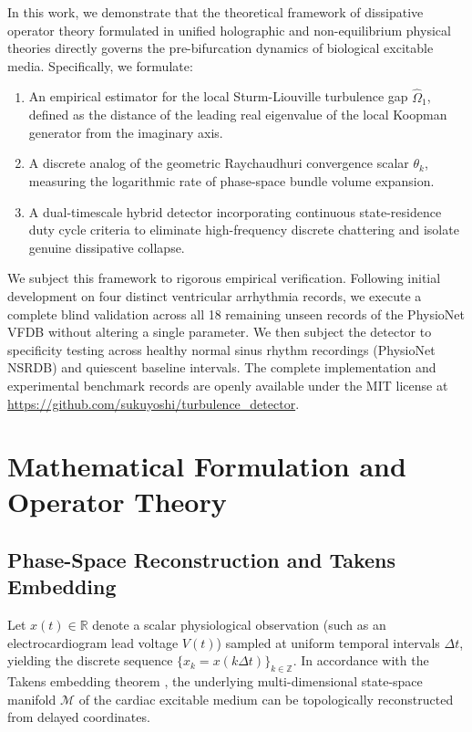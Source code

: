 \documentclass[11pt,a4paper]{article}
\begin{document}
In this work, we demonstrate that the theoretical framework of dissipative operator theory formulated in unified holographic and non-equilibrium physical theories \cite{Yoshikai2026f, Willems1972} directly governs the pre-bifurcation dynamics of biological excitable media. Specifically, we formulate:
\begin{enumerate}
    \item An empirical estimator for the local Sturm-Liouville turbulence gap $\hat{\Omega}_1$, defined as the distance of the leading real eigenvalue of the local Koopman generator from the imaginary axis.
    \item A discrete analog of the geometric Raychaudhuri convergence scalar $\theta_k$, measuring the logarithmic rate of phase-space bundle volume expansion.
    \item A dual-timescale hybrid detector incorporating continuous state-residence duty cycle criteria to eliminate high-frequency discrete chattering and isolate genuine dissipative collapse.
\end{enumerate}

We subject this framework to rigorous empirical verification. Following initial development on four distinct ventricular arrhythmia records, we execute a complete blind validation across all 18 remaining unseen records of the PhysioNet VFDB without altering a single parameter. We then subject the detector to specificity testing across healthy normal sinus rhythm recordings (PhysioNet NSRDB) and quiescent baseline intervals. The complete implementation and experimental benchmark records are openly available under the MIT license at \url{https://github.com/sukuyoshi/turbulence_detector}.

\section{Mathematical Formulation and Operator Theory}

\subsection{Phase-Space Reconstruction and Takens Embedding}

Let $x(t) \in \mathbb{R}$ denote a scalar physiological observation (such as an electrocardiogram lead voltage $V(t)$) sampled at uniform temporal intervals $\Delta t$, yielding the discrete sequence $\{x_k = x(k \Delta t)\}_{k \in \mathbb{Z}}$. In accordance with the Takens embedding theorem \cite{Takens1981}, the underlying multi-dimensional state-space manifold $\mathcal{M}$ of the cardiac excitable medium can be topologically reconstructed from delayed coordinates.
\end{document}
